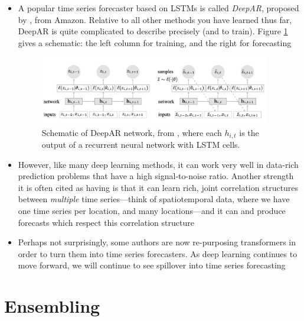 \documentclass{article}
\begin{document}
\begin{itemize}
\item A popular time series forecaster based on LSTMs is called \emph{DeepAR},
  proposed by \citet{salinas2020deep}, from Amazon. Relative to all other
  methods you have learned thus far, DeepAR is quite complicated to describe
  precisely (and to train). Figure \ref{fig:deepar} gives a schematic: the left
  column for training, and the right for forecasting

\begin{figure}[htb]
\centering
\includegraphics[width=0.95\textwidth]{deepar.png}
\caption{Schematic of DeepAR network, from \citet{salinas2020deep}, where each
  $h_{i,t}$ is the output of a recurrent neural network with LSTM cells.} 
\label{fig:deepar}
\end{figure}

\item However, like many deep learning methods, it can work very well in
  data-rich prediction problems that have a high signal-to-noise ratio. Another
  strength it is often cited as having is that it can learn rich, joint
  correlation structures between \emph{multiple} time series---think of 
  spatiotemporal data, where we have one time series per location, and many 
  locations---and it can and produce forecasts which respect this correlation
  structure 

\item Perhaps not surprisingly, some authors are now re-purposing transformers 
  in order to turn them into time series forecasters. As deep learning continues
  to move forward, we will continue to see spillover into time series
  forecasting  
\end{itemize}

\section{Ensembling}
\end{document}
